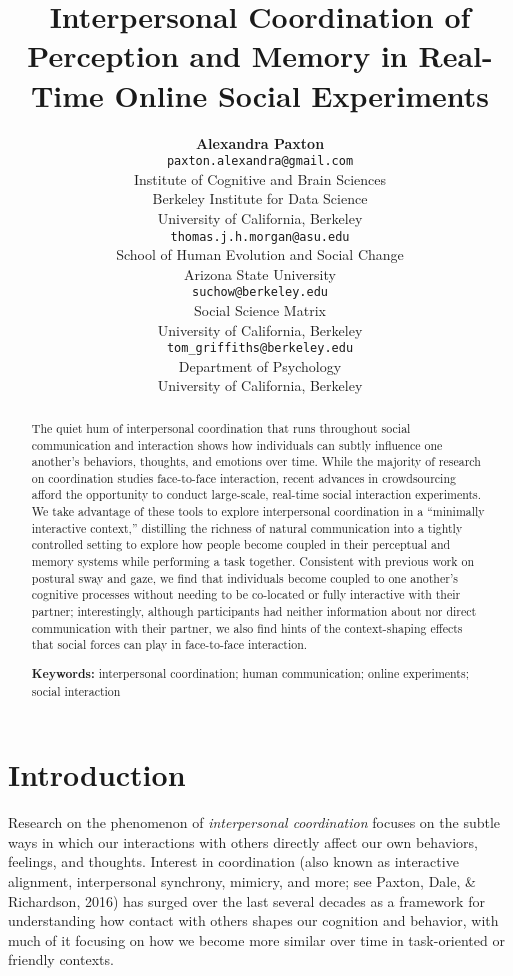 \documentclass[10pt, letterpaper]{article}
\title{Interpersonal Coordination of Perception and Memory in Real-Time Online
Social Experiments}
\author{{\large \bf Alexandra Paxton} \\ \texttt{paxton.alexandra@gmail.com} \\ Institute of Cognitive and Brain Sciences \\ Berkeley Institute for Data Science \\ University of California, Berkeley \And {\large \bf Thomas J. H. Morgan} \\ \texttt{thomas.j.h.morgan@asu.edu} \\ School of Human Evolution and Social Change \\ Arizona State University \AND {\large \bf Jordan W. Suchow} \\ \texttt{suchow@berkeley.edu} \\ Social Science Matrix \\ University of California, Berkeley \And {\large \bf Thomas L. Griffiths} \\ \texttt{tom\_griffiths@berkeley.edu} \\ Department of Psychology \\ University of California, Berkeley}
\begin{document}
\maketitle

\begin{abstract}
The quiet hum of interpersonal coordination that runs throughout social
communication and interaction shows how individuals can subtly influence
one another's behaviors, thoughts, and emotions over time. While the
majority of research on coordination studies face-to-face interaction,
recent advances in crowdsourcing afford the opportunity to conduct
large-scale, real-time social interaction experiments. We take advantage
of these tools to explore interpersonal coordination in a ``minimally
interactive context,'' distilling the richness of natural communication
into a tightly controlled setting to explore how people become coupled
in their perceptual and memory systems while performing a task together.
Consistent with previous work on postural sway and gaze, we find that
individuals become coupled to one another's cognitive processes without
needing to be co-located or fully interactive with their partner;
interestingly, although participants had neither information about nor
direct communication with their partner, we also find hints of the
context-shaping effects that social forces can play in face-to-face
interaction.

\textbf{Keywords:}
interpersonal coordination; human communication; online experiments;
social interaction
\end{abstract}

\section{Introduction}\label{introduction}

Research on the phenomenon of \emph{interpersonal coordination} focuses
on the subtle ways in which our interactions with others directly affect
our own behaviors, feelings, and thoughts. Interest in coordination
(also known as interactive alignment, interpersonal synchrony, mimicry,
and more; see Paxton, Dale, \& Richardson, 2016) has surged over the
last several decades as a framework for understanding how contact with
others shapes our cognition and behavior, with much of it focusing on
how we become more similar over time in task-oriented or friendly
contexts.
\end{document}
